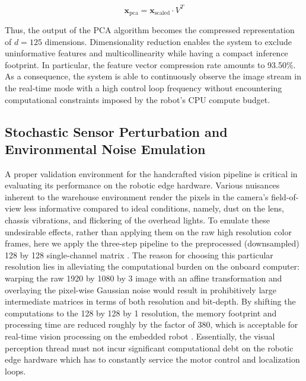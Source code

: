 \begin{equation}
\mathbf{x}_{\text{pca}} = \mathbf{x}_{\text{scaled}} \cdot V^T
\end{equation}

Thus, the output of the PCA algorithm becomes the compressed representation of $d = 125$ dimensions. Dimensionality reduction enables the system to exclude uninformative features and multicollinearity while having a compact inference footprint. In particular, the feature vector compression rate amounts to 93.50\%. As a consequence, the system is able to continuously observe the image stream in the real-time mode with a high control loop frequency without encountering computational constraints imposed by the robot's CPU compute budget.

\subsection{Stochastic Sensor Perturbation and Environmental Noise Emulation}

A proper validation environment for the handcrafted vision pipeline is critical in evaluating its performance on the robotic edge hardware. Various nuisances inherent to the warehouse environment render the pixels in the camera's field-of-view less informative compared to ideal conditions, namely, dust on the lens, chassis vibrations, and flickering of the overhead lights. To emulate these undesirable effects, rather than applying them on the raw high resolution color frames, here we apply the three-step pipeline to the preprocessed (downsampled) 128 by 128 single-channel matrix \cite{ojala2002multiresolution}. The reason for choosing this particular resolution lies in alleviating the computational burden on the onboard computer: warping the raw 1920 by 1080 by 3 image with an affine transformation and overlaying the pixel-wise Gaussian noise would result in prohibitively large intermediate matrices in terms of both resolution and bit-depth. By shifting the computations to the 128 by 128 by 1 resolution, the memory footprint and processing time are reduced roughly by the factor of 380, which is acceptable for real-time vision processing on the embedded robot \cite{dalal2005histograms}. Essentially, the visual perception thread must not incur significant computational debt on the robotic edge hardware which has to constantly service the motor control and localization loops.

